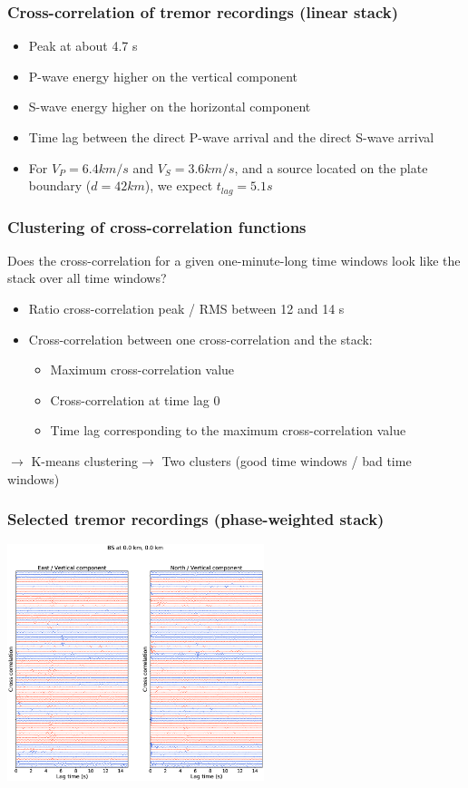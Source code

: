 \documentclass{beamer}
\begin{document}
	\begin{frame}
		\frametitle{Cross-correlation of tremor recordings (linear stack)}
		\begin{itemize}
			\item Peak at about 4.7 s
			\item P-wave energy higher on the vertical component
			\item S-wave energy higher on the horizontal component
			\item Time lag between the direct P-wave arrival and the direct S-wave arrival
			\item For $V_P = 6.4 km/s$ and $V_S = 3.6 km/s$, and a source located on the plate boundary ($d = 42 km$), we expect $t_{lag} = 5.1 s$
		\end{itemize}
	\end{frame}
		
	\begin{frame}
		\frametitle{Clustering of cross-correlation functions} 
		Does the cross-correlation for a given one-minute-long time windows look like the stack over all time windows?

		\begin{itemize}
			\item Ratio cross-correlation peak / RMS between 12 and 14 s
			\item Cross-correlation between one cross-correlation and the stack:
			\begin{itemize}
				\item Maximum cross-correlation value
				\item Cross-correlation at time lag 0
				\item Time lag corresponding to the maximum cross-correlation value
			\end{itemize}
		\end{itemize}

		$\rightarrow$ K-means clustering$\rightarrow$ Two clusters (good time windows / bad time windows)
	\end{frame}

	\begin{frame}
		\frametitle{Selected tremor recordings (phase-weighted stack)}
		\begin{center}
			\includegraphics[width=7.5cm, trim={5cm 2.5cm 5cm 4cm}, clip]{BS/BS_000_000_PWS_PWS_cluster_ccwin.eps}
		\end{center}
	\end{frame}
\end{document}
